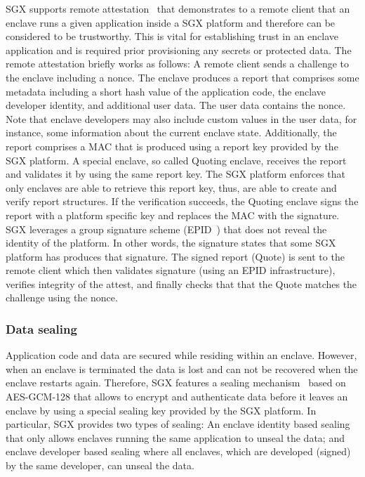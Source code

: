 \documentclass[11pt]{article}
\theoremstyle{plain-boldhead}
\theoremstyle{definition-boldhead}
\begin{document}
\ac{SGX} supports remote attestation~\cite{anati2013} that demonstrates to a remote
client that an enclave runs a given application inside a \ac{SGX} platform
and therefore can be considered to be trustworthy.
% 
This is vital for establishing trust in an enclave application and is required
prior provisioning any secrets or protected data.
% 
The remote attestation briefly works as follows:
%
A remote client sends a challenge to the enclave including a nonce.  The
enclave produces a report that comprises some metadata including a short hash
value of the application code, the enclave developer identity, and additional
user data. The user data contains the nonce.  Note that enclave developers may
also include custom values in the user data, for instance, some information
about the current enclave state.  Additionally, the report comprises a MAC
that is produced using a report key provided by the \ac{SGX} platform.
% 
A special enclave, so called Quoting enclave, receives the report and
validates it by using the same report key.  The \ac{SGX} platform enforces that
only enclaves are able to retrieve this report key, thus, are able to create
and verify report structures.
% 
If the verification succeeds, the Quoting enclave signs the report with a
platform specific key and replaces the MAC with the signature.  \ac{SGX} leverages
a group signature scheme (EPID~\cite{brickell2011enhanced}) that does not
reveal the identity of the platform.  In other words, the signature states
that some \ac{SGX} platform has produces that signature.  The signed report
(Quote) is sent to the remote client which then validates
signature (using an EPID infrastructure), verifies integrity of the attest, and
finally checks that that the Quote matches the challenge using the nonce.


\subsubsection{Data sealing}

Application code and data are secured while residing within an enclave.
However, when an enclave is terminated the data is lost and can not be
recovered when the enclave restarts again.  Therefore, \ac{SGX} features a sealing
mechanism~\cite{sgx-sdk-linux,sgx-sdk-win} based on
% 
AES-GCM-128 that allows to encrypt and authenticate data before it leaves an
enclave by using a special sealing key provided by the \ac{SGX} platform.
% 
In particular, \ac{SGX} provides two types of sealing: An enclave identity based
sealing that only allows enclaves running the same application to unseal the data; 
and enclave developer based sealing where all enclaves, which are developed (signed) by the same developer, can unseal the data.
\end{document}
